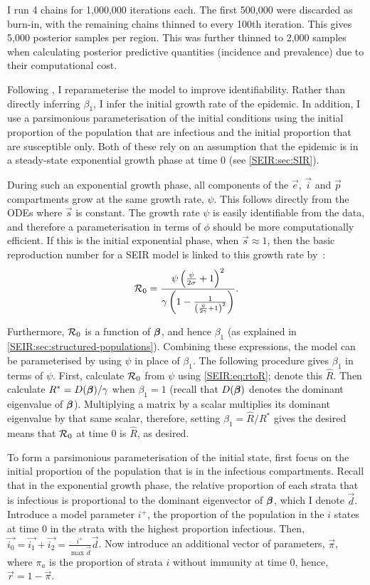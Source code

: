 \documentclass[thesis.tex]{subfiles}
\begin{document}
I run 4 chains for 1,000,000 iterations each.
The first 500,000 were discarded as burn-in, with the remaining chains thinned to every 100th iteration.
This gives 5,000 posterior samples per region.
This was further thinned to 2,000 samples when calculating posterior predictive quantities (incidence and prevalence) due to their computational cost.

Following \textcite{birrellBayesian}, I reparameterise the model to improve identifiability.
Rather than directly inferring $\beta_1$, I infer the initial growth rate of the epidemic.
In addition, I use a parsimonious parameterisation of the initial conditions using the initial proportion of the population that are infectious and the initial proportion that are susceptible only.
Both of these rely on an assumption that the epidemic is in a steady-state exponential growth phase at time 0 (see \cref{SEIR:sec:SIR}).

During such an exponential growth phase, all components of the $\vec{e}$, $\vec{i}$ and $\vec{p}$ compartments grow at the same growth rate, $\psi$.
This follows directly from the ODEs where $\vec{s}$ is constant. 
The growth rate $\psi$ is easily identifiable from the data, and therefore a parameterisation in terms of $\phi$ should be more computationally efficient.
If this is the initial exponential phase, when $\vec{s} \approx 1$, then the basic reproduction number for a SEIR model is linked to this growth rate by~\autocites{birrellBayesian}{wearingAppropriate}:
\begin{align}
    \mathcal{R}_{0} = \frac{\psi \left( \frac{\psi}{2\sigma} + 1 \right)^2}{\gamma \left(1 - \frac{1}{\left(\frac{\psi}{2 \gamma} + 1 \right)^2} \right)} \label{SEIR:eq:rtoR}.
\end{align}

Furthermore, $\mathcal{R}_{0}$ is a function of $\bm{\beta}$, and hence $\beta_1$ (as explained in \cref{SEIR:sec:structured-populations}).
Combining these expressions, the model can be parameterised by using $\psi$ in place of $\beta_1$.
The following procedure gives $\beta_1$ in terms of $\psi$.
First, calculate $\mathcal{R}_{0}$ from $\psi$ using \cref{SEIR:eq:rtoR}; denote this $\hat{R}$.
Then calculate $R^* = D(\bm{\beta}) / \gamma$ when $\beta_1=1$ (recall that $D(\bm{\beta})$ denotes the dominant eigenvalue of $\bm{\beta}$).
Multiplying a matrix by a scalar multiplies its dominant eigenvalue by that same scalar, therefore, setting $\beta_1 = \hat{R} / R^*$ gives the desired means that $\mathcal{R}_{0}$ at time 0 is $\hat{R}$, as desired.

To form a parsimonious parameterisation of the initial state, first focus on the initial proportion of the population that is in the infectious compartments.
Recall that in the exponential growth phase, the relative proportion of each strata that is infectious is proportional to the dominant eigenvector of $\bm{\beta}$, which I denote $\vec{d}$.
Introduce a model parameter $i^+$, the proportion of the population in the $i$ states at time 0 in the strata with the highest proportion infectious.
Then, $\vec{i_0} = \vec{i_1} + \vec{i_2} = \frac{i^+}{\max \vec{d}} \vec{d}$.
Now introduce an additional vector of parameters, $\vec{\pi}$, where $\pi_a$ is the proportion of strata $i$ without immunity at time 0, hence, $\vec{r} = 1 - \vec{\pi}$.
\end{document}
